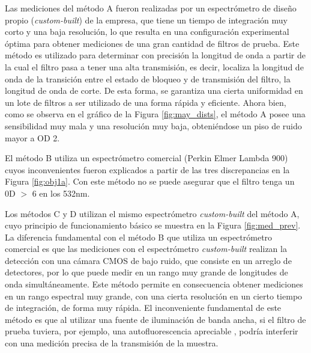 \documentclass{ctuthesis}
\begin{document}
Las mediciones del método A fueron realizadas por un espectrómetro de diseño 
propio (\textit{custom-built}) de la empresa,  que tiene un tiempo de 
integración muy corto y una baja resolución, lo que resulta en una 
configuración 
experimental óptima para obtener mediciones de una gran cantidad de filtros de 
prueba. Este método es utilizado para determinar con precisión la longitud de 
onda a partir de la cual el filtro pasa a tener una alta transmisión, es decir, 
localiza la longitud de onda de la transición entre el estado de bloqueo y de 
transmisión del filtro, la longitud de onda de corte. De esta forma, se 
garantiza una cierta uniformidad en un lote de filtros a ser utilizado de una 
forma rápida y eficiente. Ahora bien, como se observa en el gráfico de la 
Figura \ref{fig:may_dists}, el método A posee una sensibilidad muy mala y una 
resolución muy baja, obteniéndose un piso de ruido mayor a OD 2.

El método B utiliza un espectrómetro comercial (Perkin Elmer
Lambda 900) cuyos inconvenientes fueron explicados a partir de las tres 
discrepancias en la Figura \ref{fig:obj1a}. Con este método no se puede 
asegurar que el filtro tenga un 0D $>$ 6 en los 532nm.


Los métodos C y D utilizan el mismo espectrómetro \textit{custom-built}	del 
método A, cuyo principio de funcionamiento básico se muestra en la Figura 
\ref{fig:med_prev}. La diferencia fundamental con el método B que utiliza un 
espectrómetro comercial es que las mediciones con el espectrómetro 
\textit{custom-built} realizan la detección con una cámara CMOS de bajo ruido, 
que consiste en un arreglo de detectores, por lo que puede medir en un rango 
muy grande de longitudes de onda simultáneamente. Este método permite en 
consecuencia obtener mediciones en un rango espectral muy grande, con una 
cierta resolución en un cierto tiempo de integración, de forma muy rápida.
El inconveniente fundamental de este método es que al utilizar una fuente de 
iluminación de banda ancha, si el filtro de prueba tuviera, por ejemplo, una 
autofluorescencia apreciable \cite{Shah2017}, podría interferir con una 
medición precisa de la transmisión de la muestra.
\end{document}
